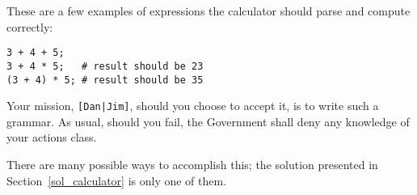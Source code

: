 These are a few examples of expressions the calculator should 
parse and compute correctly:
\begin{verbatim}
3 + 4 + 5;
3 + 4 * 5;   # result should be 23
(3 + 4) * 5; # result should be 35 
\end{verbatim}

\begin{exercise}
Your mission, \verb'[Dan|Jim]', should you choose to accept it, 
is to write such a grammar. As usual, should you fail, the 
Government shall deny any knowledge of your actions class.

There are many possible ways to accomplish this; the solution 
presented in Section~\ref{sol_calculator} is only one of them.
\end{exercise}

